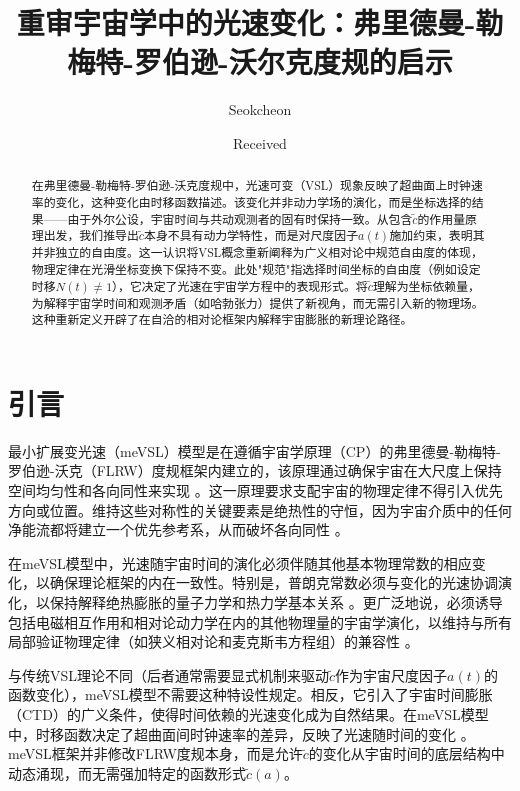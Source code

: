 \documentclass[jkps,preprint,fleqn]{revtex4}
\newcommand{\tc}{\tilde{c}}
\begin{document}
\setcounter{page}{0}

\title[]{重审宇宙学中的光速变化：弗里德曼-勒梅特-罗伯逊-沃尔克度规的启示}
\author{Seokcheon }

\date[]{Received }

\begin{abstract}
在弗里德曼-勒梅特-罗伯逊-沃克度规中，光速可变（VSL）现象反映了超曲面上时钟速率的变化，这种变化由时移函数描述。该变化并非动力学场的演化，而是坐标选择的结果——由于外尔公设，宇宙时间与共动观测者的固有时保持一致。从包含$\tc$的作用量原理出发，我们推导出$\tc$本身不具有动力学特性，而是对尺度因子$a(t)$施加约束，表明其并非独立的自由度。这一认识将VSL概念重新阐释为广义相对论中规范自由度的体现，物理定律在光滑坐标变换下保持不变。此处"规范"指选择时间坐标的自由度（例如设定时移$N(t) \neq 1$），它决定了光速在宇宙学方程中的表现形式。将$\tc$理解为坐标依赖量，为解释宇宙学时间和观测矛盾（如哈勃张力）提供了新视角，而无需引入新的物理场。这种重新定义开辟了在自洽的相对论框架内解释宇宙膨胀的新理论路径。
\end{abstract}

\maketitle

\tableofcontents
\section{引言}
\label{sec:intro}

最小扩展变光速（meVSL）模型是在遵循宇宙学原理（CP）的弗里德曼-勒梅特-罗伯逊-沃克（FLRW）度规框架内建立的，该原理通过确保宇宙在大尺度上保持空间均匀性和各向同性来实现 \cite{Lee:2020zts,Lee:2023bjz,Lee:2024mal}。这一原理要求支配宇宙的物理定律不得引入优先方向或位置。维持这些对称性的关键要素是绝热性的守恒，因为宇宙介质中的任何净能流都将建立一个优先参考系，从而破坏各向同性 \cite{Lee:2022heb}。

在meVSL模型中，光速随宇宙时间的演化必须伴随其他基本物理常数的相应变化，以确保理论框架的内在一致性。特别是，普朗克常数必须与变化的光速协调演化，以保持解释绝热膨胀的量子力学和热力学基本关系 \cite{Lee:2022heb}。更广泛地说，必须诱导包括电磁相互作用和相对论动力学在内的其他物理量的宇宙学演化，以维持与所有局部验证物理定律（如狭义相对论和麦克斯韦方程组）的兼容性 \cite{Lee:2020zts,Lee:2023bjz,Lee:2024mal,Lee:2022heb}。

与传统VSL理论不同（后者通常需要显式机制来驱动$\tc$作为宇宙尺度因子$a(t)$的函数变化），meVSL模型不需要这种特设性规定。相反，它引入了宇宙时间膨胀（CTD）的广义条件，使得时间依赖的光速变化成为自然结果。在meVSL模型中，时移函数决定了超曲面间时钟速率的差异，反映了光速随时间的变化 \cite{Lee:2024zcu}。meVSL框架并非修改FLRW度规本身，而是允许$\tc$的变化从宇宙时间的底层结构中动态涌现，而无需强加特定的函数形式$\tc(a)$。
\end{document}
